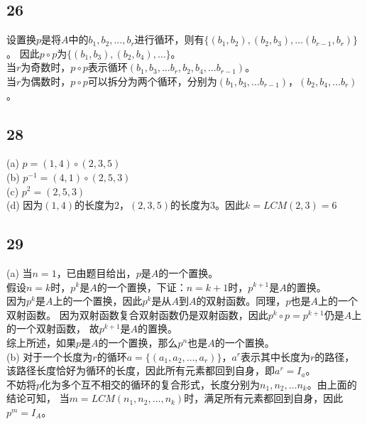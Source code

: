 \documentclass{article}
\begin{document}
\subsection{26}
设置换$p$是将$A$中的$b_1, b_2, \dots, b_r$进行循环，则有$\{(b_1, b_2), (b_2, b_3), \dots (b_{r - 1}, b_r)\}$。
因此$p \circ p$为$\{(b_1, b_3), (b_2, b_4), \dots\}$。\\
当$r$为奇数时，$p \circ p$表示循环$(b_1, b_3, \dots b_r, b_2, b_4, \dots b_{r - 1})$。\\
当$r$为偶数时，$p \circ p$可以拆分为两个循环，分别为$(b_1, b_3, \dots b_{r - 1})$，$(b_2, b_4, \dots b_r)$。
\subsection{28}
(a) $p = (1, 4) \circ (2, 3, 5)$\\
(b) $p^{-1} = (4, 1) \circ (2, 5, 3)$\\
(c) $p^2 = (2, 5, 3)$\\
(d) 因为$(1, 4)$的长度为$2$，$(2, 3, 5)$的长度为$3$。因此$k = LCM(2, 3) = 6$
\subsection{29}
(a) 当$n = 1$，已由题目给出，$p$是$A$的一个置换。\\
假设$n = k$时，$p^k$是$A$的一个置换，下证：$n = k + 1$时，$p^{k + 1}$是$A$的置换。\\
因为$p^k$是$A$上的一个置换，因此$p^k$是从$A$到$A$的双射函数。同理，$p$也是$A$上的一个双射函数。
因为双射函数复合双射函数仍是双射函数，因此$p^k \circ p = p^{k + 1}$仍是$A$上的一个双射函数，
故$p^{k + 1}$是$A$的置换。\\
综上所述，如果$p$是$A$的一个置换，那么$p^n$也是$A$的一个置换。\\
(b) 对于一个长度为$r$的循环$a = \{(a_1, a_2, \dots, a_r)\}$，$a^r$表示其中长度为$r$的路径，
该路径长度恰好为循环的长度，因此所有元素都回到自身，即$a^r = I_a$。\\
不妨将$p$化为多个互不相交的循环的复合形式，长度分别为$n_1, n_2, \dots n_k$。由上面的结论可知，
当$m = LCM(n_1, n_2, \dots, n_k)$时，满足所有元素都回到自身，因此$p^m = I_A$。
\end{document}
